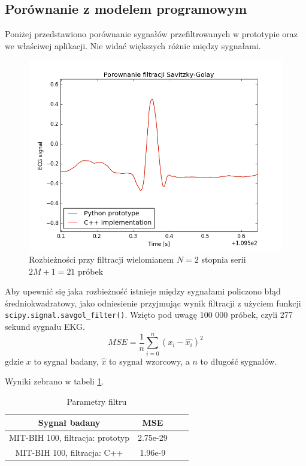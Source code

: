 \subsection{Porównanie z modelem programowym}

Poniżej przedstawiono porównanie sygnałów przefiltrowanych w prototypie oraz we właściwej aplikacji. Nie widać większych różnic między sygnałami.


\begin{figure}[H]
  \begin{center}
    \includegraphics[scale=0.8]
    {img/implem_vs_proto.png}
  \end{center}
  \caption{Rozbieżności przy filtracji wielomianem $N=2$ stopnia serii $2M+1=21$ próbek}
  \label{rys:implem1}
\end{figure}


Aby upewnić się jaka rozbieżność istnieje między sygnałami policzono błąd średniokwadratowy, jako odniesienie przyjmując wynik filtracji z użyciem funkcji \texttt{scipy.signal.savgol\_filter()}. Wzięto pod uwagę 100 000 próbek, czyli 277 sekund sygnału EKG. 
\begin{equation}
MSE = \dfrac{1}{n} \sum\limits_{i=0}^n (x_i - \hat{x_i})^2 
\end{equation}
gdzie $x$ to sygnał badany, $\hat{x}$ to sygnał wzorcowy, a $n$ to długość sygnałów.

Wyniki zebrano w tabeli \ref{tab:mse}.

\begin{table}[!htb]
  \centering
  \begin{tabular}{|c|c|c|c|}
  \hline 
  Sygnał badany  & MSE \\  
  \hline 
  MIT-BIH 100, filtracja: prototyp & 2.75e-29 \\
  \hline
  MIT-BIH 100, filtracja: C++ & 1.96e-9 \\
  \hline
\end{tabular} 
\caption{Parametry filtru}
\label{tab:mse}
\end{table}

